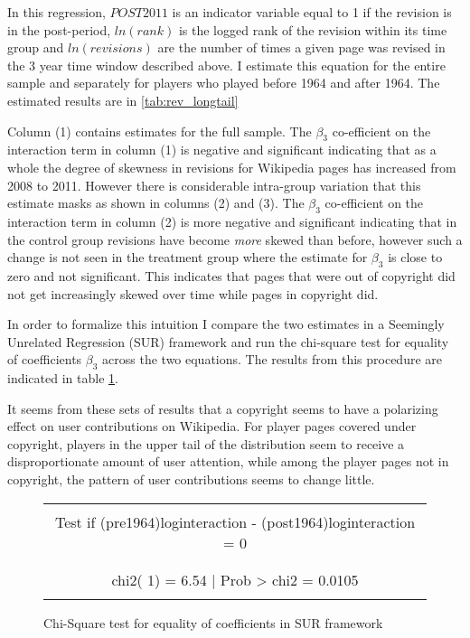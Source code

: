\documentclass[12pt]{article}
\begin{document}
In this regression, $POST2011$ is an indicator variable equal to 1 if the revision is in the post-period, $ln(rank)$ is the logged rank of the revision within its time group and $ln(revisions)$ are the number of times a given page was revised in the 3 year time window described above. I estimate this equation for the entire sample and separately for players who played before 1964 and after 1964. The estimated results are in \ref{tab:rev_longtail}

\label{tab:rev_longtail}


Column (1) contains estimates for the full sample. The $\beta_3$ co-efficient on the interaction term in column (1) is negative and significant indicating that as a whole the degree of skewness in revisions for Wikipedia pages has increased from 2008 to 2011. However there is considerable intra-group variation that this estimate masks as shown in columns (2) and (3). The $\beta_3$ co-efficient on the interaction term in column (2) is more negative and significant indicating that in the control group revisions have become \emph{more} skewed than before, however such a change is not seen in the treatment group where the estimate for $\beta_3$ is close to zero and not significant. This indicates that pages that were out of copyright did not get increasingly skewed over time while pages in copyright did. 

In order to formalize this intuition I compare the two estimates in a Seemingly Unrelated Regression (SUR) framework and run the chi-square test for equality of coefficients $\beta_3$ across the two equations. The results from this procedure are indicated in table \ref{fig:surtable}. 

It seems from these sets of results that a copyright seems to have a polarizing effect on user contributions on Wikipedia. For player pages covered under copyright, players in the upper tail of the distribution seem to receive a disproportionate amount of user attention, while among the player pages not in copyright, the pattern of user contributions seems to change little. 

\begin{figure}[h]
\centering
\begin{tabular}{ | c | }
  \hline                        
\\
  Test if (pre1964)loginteraction - (post1964)loginteraction = 0  \\
\\
\hline                        
\\
           chi2(  1) =    6.54 | Prob > chi2 =    0.0105\\
\\
\hline
\end{tabular}
\caption{Chi-Square test for equality of coefficients in SUR framework}
\label{fig:surtable}
\end{figure}
\end{document}
